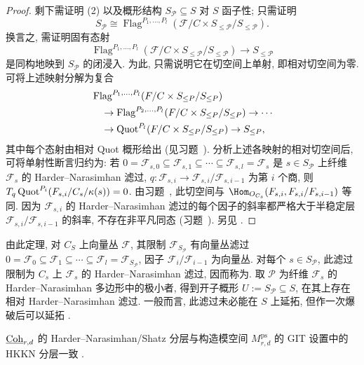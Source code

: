 \begin{proof}
剩下需证明 (2) 以及概形结构 $S_{\mathcal P}\subseteq S$ 对 $S$ 函子性; 只需证明
\[
S_{\mathcal P}\cong\operatorname{Flag}^{P_1,\ldots,P_l}(\mathcal F/C\times S_{\leq\mathcal P}/S_{\leq\mathcal P}).
\]
换言之, 需证明固有态射
\[
\operatorname{Flag}^{P_1,\ldots,P_l}(\mathcal F/C\times S_{\leq\mathcal P}/S_{\leq\mathcal P})\to S_{\leq\mathcal P}
\]
是同构地映到 $S_{\mathcal P}$ 的闭浸入. 为此, 只需说明它在切空间上单射, 即相对切空间为零. 可将上述映射分解为复合
\[
\begin{aligned}
&\operatorname{Flag}^{P_1,\ldots,P_l}(F/C\times S_{\leq P}/S_{\leq P})\\
&\quad\to\operatorname{Flag}^{P_2,\ldots,P_l}(F/C\times S_{\leq P}/S_{\leq P})\to\cdots\\
&\quad\to\operatorname{Quot}^{P_l}(F/C\times S_{\leq P}/S_{\leq P})\to S_{\leq P},
\end{aligned}
\]
其中每个态射由相对 Quot 概形给出 (见习题~). 分析上述各映射的相对切空间后, 可将单射性断言归约为: 若 $0=\mathcal F_{s,0}\subseteq\mathcal F_{s,1}\subseteq\cdots\subseteq\mathcal F_{s,l}=\mathcal F_s$ 是 $s\in S_{\mathcal P}$ 上纤维 $\mathcal F_s$ 的 Harder--Narasimhan 滤过, $q:\mathcal F_{s,i}\to\mathcal F_{s,i}/\mathcal F_{s,i-1}$ 为第 $i$ 个商, 则 $T_q\operatorname{Quot}^{P_i}(F_{s,i}/C_s/\kappa(s))=0$. 由习题~, 此切空间与 $\Hom_{\mathcal O_{C_s}}(\mathcal F_{s,i},\mathcal F_{s,i}/\mathcal F_{s,i-1})$ 等同. 因为 $\mathcal F_{s,i}$ 的 Harder--Narasimhan 滤过的每个因子的斜率都严格大于半稳定层 $\mathcal F_{s,i}/\mathcal F_{s,i-1}$ 的斜率, 不存在非平凡同态 (习题~). 另见 \cite{Sha77,Nit11}.
\end{proof}
\begin{remark}\label{src:9.3.17}
由此定理, 对 $C_S$ 上向量丛 $\mathcal F$, 其限制 $\mathcal F_{S_{\mathcal P}}$ 有向量丛滤过 $0=\mathcal F_0\subseteq\mathcal F_1\subseteq\cdots\subseteq\mathcal F_l=\mathcal F_{S_{\mathcal P}}$, 因子 $\mathcal F_i/\mathcal F_{i-1}$ 为向量丛. 对每个 $s\in S_{\mathcal P}$, 此滤过限制为 $C_s$ 上 $\mathcal F_s$ 的 Harder--Narasimhan 滤过, 因而称为. 取 $\mathcal P$ 为纤维 $\mathcal F_s$ 的 Harder--Narasimhan 多边形中的极小者, 得到开子概形 $U:=S_{\mathcal P}\subseteq S$, 在其上存在相对 Harder--Narasimhan 滤过. 一般而言, 此滤过未必能在 $S$ 上延拓, 但作一次爆破后可以延拓 \cite[定理 2.3.2]{HL10}.
\end{remark}
\begin{remark}\label{src:9.3.18}
$\underline{\mathrm{Coh}}_{r,d}$ 的 Harder--Narasimhan/Shatz 分层与构造模空间 $M_{r,d}^{\mathrm{ps}}$ 的 GIT 设置中的 HKKN 分层一致 \cite{Hos18}.
\end{remark}
